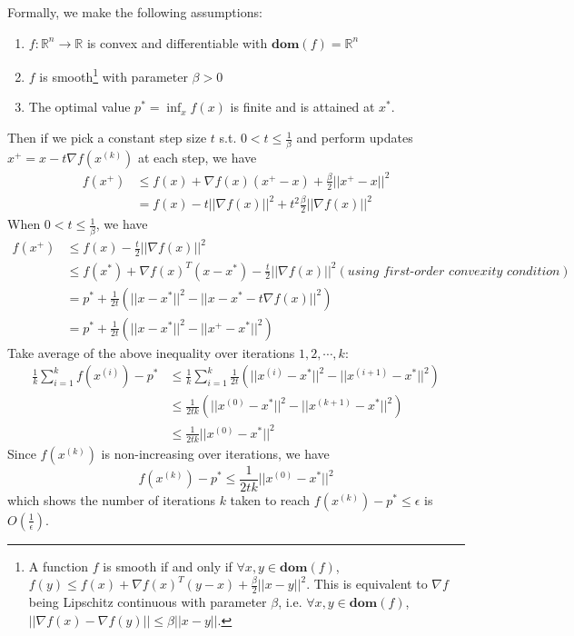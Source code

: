 \documentclass[11pt]{article}
\begin{document}
Formally, we make the following assumptions:
\begin{enumerate}[label=(\alph*)]
\item $f: \mathbb{R}^n \rightarrow \mathbb{R}$ is convex and differentiable with $\textbf{dom}(f) = \mathbb{R}^n$
\item $f$ is smooth\footnote{A function $f$ is smooth if and only if $\forall x, y \in \textbf{dom}(f)$, $f(y) \leq f(x) + \nabla f(x)^{T}(y-x) + \frac{\beta}{2}||x-y||^2$. This is equivalent to $\nabla f$ being Lipschitz continuous with parameter $\beta$, i.e. $\forall x, y \in \textbf{dom}(f)$, $||\nabla f(x) - \nabla f(y)|| \leq \beta ||x-y||$.} with parameter $\beta >0$
\item The optimal value $p^{*}=\inf_x f(x)$ is finite and is attained at $x^{*}$.
\end{enumerate}
Then if we pick a constant step size $t$ s.t. $0 < t \leq \frac{1}{\beta}$ and perform updates $x^{+} = x - t \nabla f(x^{(k)})$ at each step, we have
\begin{equation}
\begin{split}
f(x^+) & \leq f(x) + \nabla f(x)(x^+ -x)+\frac{\beta}{2}||x^+ - x||^2\\
& = f(x) - t||\nabla f(x)||^2+t^2 \frac{\beta}{2}||\nabla f(x)||^2
\end{split}
\end{equation}
When $0 < t \leq \frac{1}{\beta}$, we have
\begin{equation}
\begin{split}
f(x^+) & \leq f(x) - \frac{t}{2}||\nabla f(x)||^2\\
& \leq f(x^*) + \nabla f(x)^T (x - x^*) - \frac{t}{2}||\nabla f(x)||^2 (\textit{using first-order convexity condition})\\
& = p^* + \frac{1}{2t}(||x - x^*||^2 - ||x - x^*-t \nabla f(x)||^2)\\
& = p^* + \frac{1}{2t}(||x - x^*||^2 - ||x^+ - x^*||^2)
\end{split}
\end{equation}
Take average of the above inequality over iterations $1,2,\cdots,k$:
\begin{equation}
\begin{split}
\frac{1}{k} \sum_{i=1}^k f(x^{(i)})-p^* & \leq \frac{1}{k} \sum_{i=1}^k \frac{1}{2t}(||x^{(i)} - x^*||^2 - ||x^{(i+1)} - x^*||^2)\\
& \leq \frac{1}{2tk}(||x^{(0)} - x^*||^2 - ||x^{(k+1)} - x^*||^2)\\
& \leq \frac{1}{2tk}||x^{(0)} - x^*||^2
\end{split}
\end{equation}
Since $f(x^{(k)})$ is non-increasing over iterations, we have
\begin{equation}
f(x^{(k)})-p^* \leq \frac{1}{2tk}||x^{(0)} - x^*||^2
\end{equation}
which shows the number of iterations $k$ taken to reach $f(x^{(k)})-p^* \leq \epsilon$ is $O(\frac{1}{\epsilon})$. 
\end{document}
